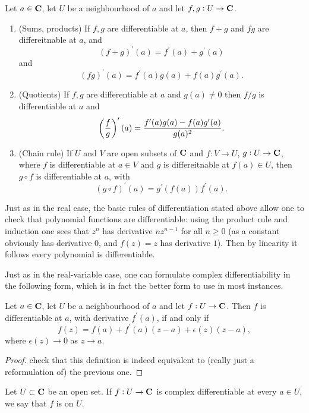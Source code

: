 \begin{lemma}
Let $a\in\mathbf C$, let $U$ be a neighbourhood of $a$ and let $f,g:U\to\mathbf C$.
\begin{enumerate}[label=(\roman*)]
\item (Sums, products) If $f,g$ are differentiable at $a$, then $f+g$ and $fg$ are differeitnable at $a$, and
\[(f+g)^\prime(a)=f^\prime(a)+g^\prime(a)\]
and
\[(fg)^\prime(a)=f^\prime(a)g(a)+f(a)g^\prime(a).\]
\item (Quotients) If $f,g$ are differentiable at $a$ and $g(a)\neq0$ then $f/g$ is differentiable at $a$ and
\[\left(\frac{f}{g}\right)^\prime(a)=\frac{f^\prime(a)g(a)-f(a)g^\prime(a)}{g(a)^2}.\]
\item (Chain rule) If $U$ and $V$ are open subsets of $\mathbf C$ and $f:V\to U$, $g:U\to\mathbf C$, where $f$ is differentiable at $a\in V$ and $g$ is differeitnable at $f(a)\in U$, then $g\circ f$ is differentiable at $a$, with
\[(g\circ f)^\prime(a)=g^\prime(f(a))f^\prime(a).\]
\end{enumerate}
\end{lemma}

Just as in the real case, the basic rules of differentiation stated above allow one to check that polynomial functions are differentiable: using the product rule and induction one sees that $z^n$ has derivative $nz^{n-1}$ for all $n\ge0$ (as a constant obviously has derivative $0$, and $f(z)=z$ has derivative $1$). Then by linearity it follows every polynomial is differentiable.

Just as in the real-variable case, one can formulate complex differentiability in the following form, which is in fact the better form to use in most instances.

\begin{lemma}
Let $a\in\mathbf C$, let $U$ be a neighbourhood of $a$ and let $f:U\to\mathbf C$. Then $f$ is differentiable at $a$, with derivative $f^\prime(a)$, if and only if
\[f(z)=f(a)+f^\prime(a)(z-a)+\epsilon(z)(z-a),\]
where $\epsilon(z)\to0$ as $z\to a$.
\end{lemma}

\begin{proof}
check that this definition is indeed equivalent to (really just a reformulation of) the previous one.
\end{proof}

\begin{definition}
Let $U\subset\mathbf C$ be an open set. If $f:U\to\mathbf C$ is complex differentiable at every $a\in U$, we say that $f$ is  on $U$.
\end{definition}

